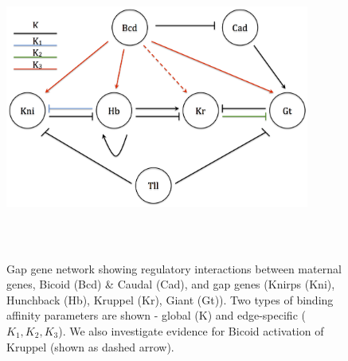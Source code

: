 \begin{figure}
    \centering
    \includegraphics[height = 10cm, width = 10cm]{tex/embryo/figure-2.png}
    \caption{Gap gene network showing regulatory interactions between maternal genes, Bicoid (Bcd) \& Caudal (Cad), and gap genes (Knirps (Kni), Hunchback (Hb), Kruppel (Kr), Giant (Gt)). Two types of binding affinity parameters are shown - global (K) and edge-specific ($K_1, K_2, K_3$). We also investigate evidence for Bicoid activation of Kruppel (shown as dashed arrow).}
    \label{fig:figure-2}
\end{figure}


